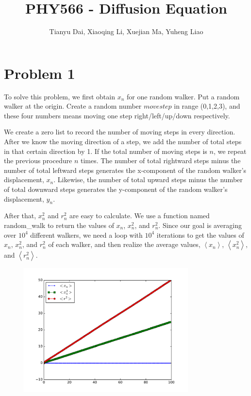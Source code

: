 \documentclass{article}
\author{Tianyu Dai, Xiaoqing Li, Xuejian Ma, Yuheng Liao }
\title{PHY566 - Diffusion Equation}
\begin{document}
\date{}
\maketitle
\section{Problem 1}
\quad To solve this problem, we first obtain $x_{n}$ for one random walker. Put a
random walker at the origin. Create a random number $movestep$ in range
(0,1,2,3), and these four numbers means moving one step right/left/up/down
respectively.

We create a zero list to record the number of moving steps in every
direction. After we know the moving direction of a step, we add the number of
total steps in that certain direction by 1. If the total number of moving
steps is $n$, we repeat the previous procedure $n$ times. The number of
total rightward steps minus the number of total leftward steps generates the
x-component of the random walker's displacement, $x_{n}$. Likewise, the
number of total upward steps minus the number of total downward steps
generates the y-component of the random walker's displacement, $y_{n}$.

After that, $x_{n}^{2}$ and $r_{n}^{2}$ are easy to calculate. We use a
function named random\_walk to return the values of $x_{n}$,  $x_{n}^{2}$,
and $r_{n}^{2}$. Since our goal is averaging over $10^{4}$ different
walkers, we need a loop with $10^{4}$ iterations to get the values of $%
x_{n}$, $x_{n}^{2}$, and $r_{n}^{2}$ of each walker, and then realize the
average values, $\left\langle x_{n}\right\rangle $, $\left\langle
x_{n}^{2}\right\rangle $, and $\left\langle r_{n}^{2}\right\rangle $.
\begin{figure}[!ht]
	\centering
\includegraphics[width=0.8\textwidth]{./RandomWalk.pdf}
\end{figure}
\end{document}
